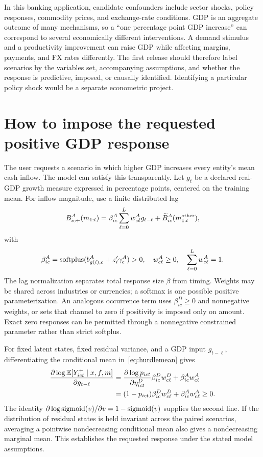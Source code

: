 In this banking application, candidate confounders include sector shocks, policy responses, commodity prices, and exchange-rate conditions. GDP is an aggregate outcome of many mechanisms, so a ``one percentage point GDP increase'' can correspond to several economically different interventions. A demand stimulus and a productivity improvement can raise GDP while affecting margins, payments, and FX rates differently. The first release should therefore label scenarios by the variables set, accompanying assumptions, and whether the response is predictive, imposed, or causally identified. Identifying a particular policy shock would be a separate econometric project.

\section{How to impose the requested positive GDP response}
The user requests a scenario in which higher GDP increases every entity's mean cash inflow. The model can satisfy this transparently. Let $g_t$ be a declared real-GDP growth measure expressed in percentage points, centered on the training mean. For inflow magnitude, use a finite distributed lag
\begin{equation}
B^A_{ic+}(m_{1:t})
=\beta^A_{ic}\sum_{\ell=0}^{L}w^A_{c\ell}g_{t-\ell}
+\widetilde B^A_{ic}(m_{1:t}^{\rm other}),
\label{eq:gdpkernel}
\end{equation}
with
\begin{equation}
\beta^A_{ic}=\operatorname{softplus}(b^A_{g(i),c}+z_i'\gamma^A_c)>0,
\quad w^A_{c\ell}\geq0,\quad\sum_{\ell=0}^{L}w^A_{c\ell}=1.
\end{equation}
The lag normalization separates total response size $\beta$ from timing. Weights may be shared across industries or currencies; a softmax is one possible positive parameterization. An analogous occurrence term uses $\beta^D_{ic}\geq0$ and nonnegative weights, or sets that channel to zero if positivity is imposed only on amount. Exact zero responses can be permitted through a nonnegative constrained parameter rather than strict softplus.

For fixed latent states, fixed residual variance, and a GDP input $g_{t-\ell}$, differentiating the conditional mean in~\eqref{eq:hurdlemean} gives
\begin{align}
\frac{\partial\log\mathbb E[Y^+_{ict}\mid x,f,m]}{\partial g_{t-\ell}}
&=\frac{\partial\log p_{ict}}{\partial\eta^D_{ict}}
      \beta^D_{ic}w^D_{c\ell}+\beta^A_{ic}w^A_{c\ell}\nonumber\\
&=(1-p_{ict})\beta^D_{ic}w^D_{c\ell}
       +\beta^A_{ic}w^A_{c\ell}\geq0.
\label{eq:monotone}
\end{align}
The identity $\partial\log\operatorname{sigmoid}(v)/\partial v=1-\operatorname{sigmoid}(v)$ supplies the second line. If the distribution of residual states is held invariant across the paired scenarios, averaging a pointwise nondecreasing conditional mean also gives a nondecreasing marginal mean. This establishes the requested response under the stated model assumptions.

